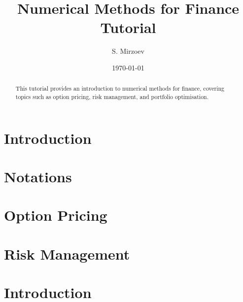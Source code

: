 \documentclass{article}
\title{Numerical Methods for Finance Tutorial}
\author{S. Mirzoev}
\date{\today}
\begin{document}
\maketitle

\begin{abstract}
This tutorial provides an introduction to numerical methods for finance, covering topics such as option pricing, risk management, and portfolio optimisation.
\end{abstract}

\section{Introduction}


\section{Notations}


\section{Option Pricing}
% 

\section{Risk Management}
% 


\section{Introduction}
\end{document}
